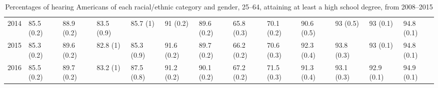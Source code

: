 \documentclass{article}\usepackage[]{graphicx}\usepackage[]{color}
\begin{document}
\begin{landscape}
\begin{table}[ht]
\begin{tabular}{rllllllllllll}
  2014 & 85.5 (0.2) & 88.9 (0.2) & 83.5 (0.9) & 85.7 (1) & 91 (0.2) & 89.6 (0.2) & 65.8 (0.3) & 70.1 (0.2) & 90.6 (0.5) & 93 (0.5) & 93 (0.1) & 94.8 (0.1) \\
  2015 & 85.3 (0.2) & 89.6 (0.2) & 82.8 (1) & 85.3 (0.9) & 91.6 (0.2) & 89.7 (0.2) & 66.2 (0.2) & 70.6 (0.3) & 92.3 (0.4) & 93.8 (0.3) & 93 (0.1) & 94.8 (0.1) \\
  2016 & 85.5 (0.2) & 89.7 (0.2) & 83.2 (1) & 87.5 (0.8) & 91.2 (0.2) & 90.1 (0.2) & 67.2 (0.2) & 71.5 (0.3) & 91.3 (0.4) & 93.1 (0.3) & 92.9 (0.1) & 94.9 (0.1) \\
   \hline
\end{tabular}
\caption{Percentages of hearing Americans of each racial/ethnic category and gender, 25--64, attaining at least a high school degree, from 2008--2015}
\end{table}

\end{landscape}
\end{document}
